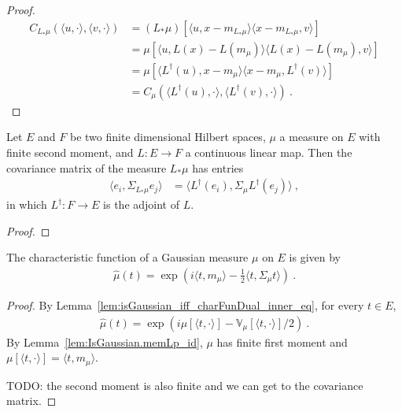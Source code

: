 \begin{proof}
\begin{align*}
  C_{L_*\mu}(\langle u, \cdot\rangle, \langle v, \cdot\rangle)
  &= (L_*\mu)\left[\langle u, x - m_{L_*\mu}\rangle \langle x - m_{L_*\mu}, v \rangle\right]
  \\
  &= \mu\left[\langle u, L(x) - L(m_\mu)\rangle \langle L(x) - L(m_\mu), v \rangle \right]
  \\
  &= \mu\left[\langle L^\dagger(u), x - m_\mu\rangle \langle x - m_\mu, L^\dagger(v) \rangle \right]
  \\
  &= C_\mu(\langle L^\dagger(u), \cdot\rangle, \langle L^\dagger(v), \cdot\rangle)
  \: .
\end{align*}
\end{proof}


\begin{lemma}\label{lem:covMatrix_map}
Let $E$ and $F$ be two finite dimensional Hilbert spaces, $\mu$ a measure on $E$ with finite second moment, and $L : E \to F$ a continuous linear map.
Then the covariance matrix of the measure $L_*\mu$ has entries
\begin{align*}
  \langle e_i, \Sigma_{L_*\mu} e_j\rangle
  &= \langle L^\dagger(e_i), \Sigma_\mu L^\dagger(e_j)\rangle
  \: ,
\end{align*}
in which $L^\dagger : F \to E$ is the adjoint of $L$.
\end{lemma}

\begin{proof}

\end{proof}


\begin{lemma}\label{lem:IsGaussian.charFun_eq}
The characteristic function of a Gaussian measure $\mu$ on $E$ is given by
\begin{align*}
  \hat{\mu}(t) = \exp\left(i \langle t, m_\mu \rangle - \frac{1}{2} \langle t, \Sigma_\mu t \rangle\right) \: .
\end{align*}
\end{lemma}

\begin{proof}
By Lemma~\ref{lem:isGaussian_iff_charFunDual_inner_eq}, for every $t \in E$,
\begin{align*}
  \hat{\mu}(t) = \exp\left(i \mu[\langle t, \cdot \rangle] - \mathbb{V}_\mu[\langle t, \cdot \rangle] / 2\right) \: .
\end{align*}
By Lemma~\ref{lem:IsGaussian.memLp_id}, $\mu$ has finite first moment and $\mu[\langle t, \cdot \rangle] = \langle t, m_\mu \rangle$.

TODO: the second moment is also finite and we can get to the covariance matrix.
\end{proof}


